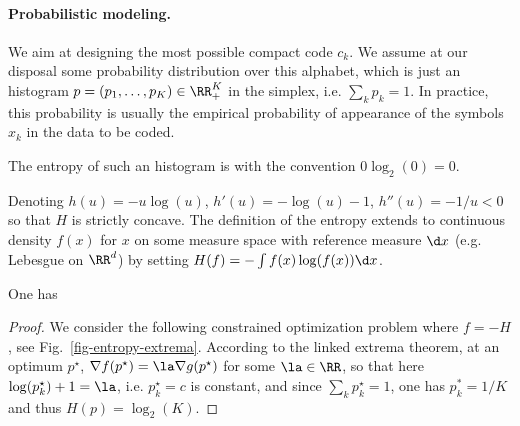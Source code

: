 \paragraph{Probabilistic modeling.}

We aim at designing the most possible compact code $c_k$. 
%
We assume at our disposal some probability distribution over this alphabet, which is just an histogram $p=(p_1,\ldots,p_K) \in \RR_+^K$ in the simplex, i.e. $\sum_k p_k=1$. 
%
In practice, this probability is usually the empirical probability of appearance of the symbols $x_k$ in the data to be coded. 


The entropy of such an histogram is 
with the convention $0\log_2(0)=0$. 

Denoting $h(u)=-u \log(u)$, $h'(u)=-\log(u)-1$, $h''(u)=-1/u<0$ so that $H$ is strictly concave. The definition of the entropy extends to continuous density $f(x)$ for $x$ on some measure space with reference measure $\d x$ (e.g. Lebesgue on $\RR^d$) by setting $H(f)=-\int f(x) \log(f(x)) \d x$. 






\begin{lem} One has
\end{lem}


\begin{proof}
	We consider the following constrained optimization problem
	where $f=-H$, see Fig.~\ref{fig-entropy-extrema}. According to the linked extrema theorem, at an optimum $p^\star$, $\nabla f(p^\star)=\la \nabla g(p^\star)$ for some $\la \in \RR$, so that here $\log(p_k^\star)+1 = \la$, i.e. $p_k^\star=c$ is constant, and since 
	$\sum_k p_k^\star=1$, 	
	one has $p_k^*=1/K$ and thus $H(p)=\log_2(K)$.
\end{proof}


